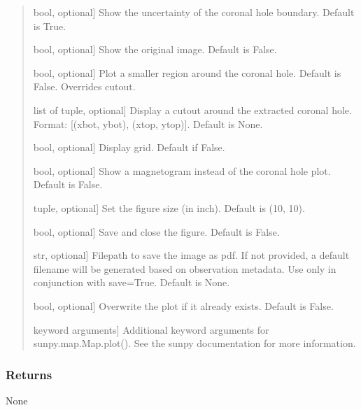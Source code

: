 \documentclass[letterpaper,10pt,english]{sphinxmanual}
\begin{document}
\begin{fulllineitems}
\begin{fulllineitems}
\begin{quote}
\begin{description}
\sphinxlineitem{uncertainty}{[}bool, optional{]}
\sphinxAtStartPar
Show the uncertainty of the coronal hole boundary. Default is True.

\sphinxlineitem{original}{[}bool, optional{]}
\sphinxAtStartPar
Show the original image. Default is False.

\sphinxlineitem{small}{[}bool, optional{]}
\sphinxAtStartPar
Plot a smaller region around the coronal hole. Default is False.
Overrides cutout.

\sphinxlineitem{cutout}{[}list of tuple, optional{]}
\sphinxAtStartPar
Display a cutout around the extracted coronal hole. Format: {[}(xbot, ybot), (xtop, ytop){]}. Default is None.

\sphinxlineitem{grid}{[}bool, optional{]}
\sphinxAtStartPar
Display grid. Default if False.

\sphinxlineitem{mag}{[}bool, optional{]}
\sphinxAtStartPar
Show a magnetogram instead of the coronal hole plot. Default is False.

\sphinxlineitem{fsize}{[}tuple, optional{]}
\sphinxAtStartPar
Set the figure size (in inch). Default is (10, 10).

\sphinxlineitem{save}{[}bool, optional{]}
\sphinxAtStartPar
Save and close the figure. Default is False.

\sphinxlineitem{sfile}{[}str, optional{]}
\sphinxAtStartPar
Filepath to save the image as pdf. If not provided, a default filename will be generated based on observation metadata.
Use only in conjunction with save=True. Default is None.

\sphinxlineitem{overwrite}{[}bool, optional{]}
\sphinxAtStartPar
Overwrite the plot if it already exists. Default is False.

\sphinxlineitem{** kwargs}{[}keyword arguments{]}
\sphinxAtStartPar
Additional keyword arguments for sunpy.map.Map.plot(). See the sunpy documentation for more information.

\end{description}
\end{quote}


\subsubsection{Returns}
\label{\detokenize{pycatch/pycatch:id22}}
\sphinxAtStartPar
None

\end{fulllineitems}



\end{fulllineitems}
\end{document}
